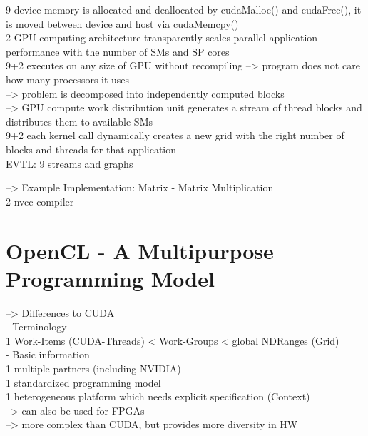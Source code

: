 \documentclass[a4paper,12pt]{llncs}
\numberwithin{equation}{section}
\begin{document}
    9 device memory is allocated and deallocated by cudaMalloc() and cudaFree(), it is moved between device and host via cudaMemcpy()\\
    

  
    2 GPU computing architecture transparently scales parallel application performance with the number of SMs and SP cores\\
    9+2 executes on any size of GPU without recompiling --> program does not care how many processors it uses\\
      --> problem is decomposed into independently computed blocks\\
      --> GPU compute work distribution unit generates a stream of thread blocks and distributes them to available SMs\\
     9+2 each kernel call dynamically creates a new grid with the right number of blocks and threads for that application\\



     EVTL: 9 streams and graphs

  --> Example Implementation: Matrix - Matrix Multiplication\\
    2 nvcc compiler\\

 
\section{OpenCL - A Multipurpose Programming Model}
  --> Differences to CUDA\\
  - Terminology\\
      1 Work-Items (CUDA-Threads) < Work-Groups < global NDRanges (Grid)\\
  - Basic information\\
      1 multiple partners (including NVIDIA)\\
      1 standardized programming model\\
      1 heterogeneous platform which needs explicit specification (Context)\\
        --> can also be used for FPGAs\\
        --> more complex than CUDA, but provides more diversity in HW\\
      


\end{document}
